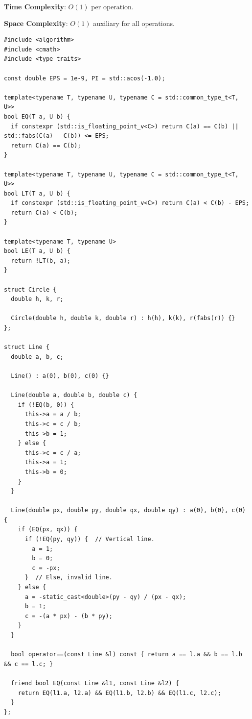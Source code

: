 \textbf{Time Complexity}: $O(1)$ per operation.

\textbf{Space Complexity}: $O(1)$ auxiliary for all operations.

\begin{lstlisting}[style=cpp]
#include <algorithm>
#include <cmath>
#include <type_traits>

const double EPS = 1e-9, PI = std::acos(-1.0);

template<typename T, typename U, typename C = std::common_type_t<T, U>>
bool EQ(T a, U b) {
  if constexpr (std::is_floating_point_v<C>) return C(a) == C(b) || std::fabs(C(a) - C(b)) <= EPS;
  return C(a) == C(b);
}

template<typename T, typename U, typename C = std::common_type_t<T, U>>
bool LT(T a, U b) {
  if constexpr (std::is_floating_point_v<C>) return C(a) < C(b) - EPS;
  return C(a) < C(b);
}

template<typename T, typename U>
bool LE(T a, U b) {
  return !LT(b, a);
}

struct Circle {
  double h, k, r;

  Circle(double h, double k, double r) : h(h), k(k), r(fabs(r)) {}
};

struct Line {
  double a, b, c;

  Line() : a(0), b(0), c(0) {}

  Line(double a, double b, double c) {
    if (!EQ(b, 0)) {
      this->a = a / b;
      this->c = c / b;
      this->b = 1;
    } else {
      this->c = c / a;
      this->a = 1;
      this->b = 0;
    }
  }

  Line(double px, double py, double qx, double qy) : a(0), b(0), c(0) {
    if (EQ(px, qx)) {
      if (!EQ(py, qy)) {  // Vertical line.
        a = 1;
        b = 0;
        c = -px;
      }  // Else, invalid line.
    } else {
      a = -static_cast<double>(py - qy) / (px - qx);
      b = 1;
      c = -(a * px) - (b * py);
    }
  }

  bool operator==(const Line &l) const { return a == l.a && b == l.b && c == l.c; }

  friend bool EQ(const Line &l1, const Line &l2) {
    return EQ(l1.a, l2.a) && EQ(l1.b, l2.b) && EQ(l1.c, l2.c);
  }
};


\end{lstlisting}
